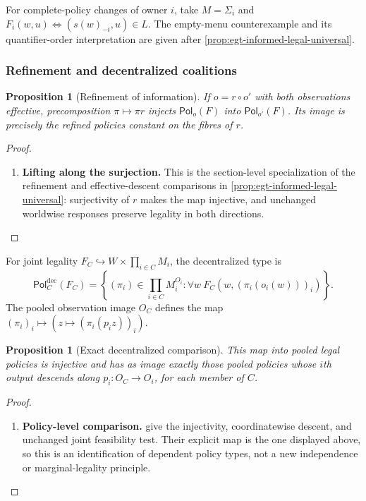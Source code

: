 \documentclass[11pt,a4paper]{article}
\numberwithin{equation}{section}
\newtheorem{proposition}[theorem]{Proposition}
\theoremstyle{definition}
\theoremstyle{remark}
\theoremstyle{plain}
\providecommand{\Pol}{\mathsf{Pol}}
\begin{document}
For complete-policy changes of owner $i$, take $M=\Sigma_i$ and
$F_i(w,u)\iff(s(w)_{-i},u)\in L$. The empty-menu counterexample and
its quantifier-order interpretation are given after
\cref{prop:egt-informed-legal-universal}.

\subsubsection{Refinement and decentralized coalitions}

\begin{proposition}[Refinement of information]
\label{agt-prop-info-refinement}
If $o=r\circ o'$ with both observations effective, precomposition
$\pi\mapsto\pi r$ injects $\Pol_o(F)$ into $\Pol_{o'}(F)$.
Its image is precisely the refined policies constant on the fibres of $r$.
\end{proposition}
\begin{proof}
\leavevmode
\begin{enumerate}[label=\textup{(\arabic*)},leftmargin=*,itemsep=4pt,topsep=3pt]
  \item \textbf{Lifting along the surjection.} This is the section-level specialization of the refinement and
effective-descent comparisons in \cref{prop:egt-informed-legal-universal}:
surjectivity of $r$ makes the map injective, and unchanged worldwise
responses preserve legality in both directions.
\end{enumerate}
\end{proof}

For joint legality $F_C\hookrightarrow W\times\prod_{i\in C}M_i$,
the decentralized type is
\[
 \Pol_C^{\mathrm{dec}}(F_C)=
 \left\{(\pi_i)\in\prod_{i\in C}M_i^{O_i}:
 \forall w\ F_C(w,(\pi_i(o_i(w)))_i)\right\}.
\]
The pooled observation image $O_C$ defines the map
$(\pi_i)_i\mapsto(z\mapsto(\pi_i(p_i z))_i)$.

\begin{proposition}[Exact decentralized comparison]
\label{agt-prop-decentralized}
This map into pooled legal policies is injective and has as image
exactly those pooled policies whose $i$th output descends along
$p_i:O_C\to O_i$, for each member of $C$.
\end{proposition}
\begin{proof}
\leavevmode
\begin{enumerate}[label=\textup{(\arabic*)},leftmargin=*,itemsep=4pt,topsep=3pt]
  \item \textbf{Policy-level comparison.} 
give the injectivity, coordinatewise descent, and unchanged joint
feasibility test. Their explicit map is the one displayed above, so
this is an identification of dependent policy types, not a new
independence or marginal-legality principle.
\end{enumerate}
\end{proof}
\end{document}

